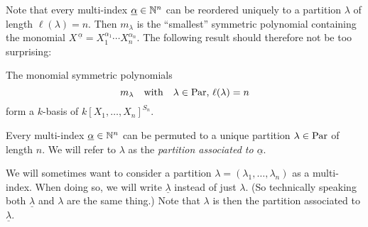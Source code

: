 \begin{fluff}
  Note that every multi-index $\underline{\alpha} \in \mathbb{N}^n$ can be reordered uniquely to a partition $\lambda$ of length $\ell(\lambda) = n$.
  Then $m_\lambda$ is the “smallest” symmetric polynomial containing the monomial $X^{\,\underline{\alpha}} = X_1^{\alpha_1} \dotsm X_n^{\alpha_n}$.
  The following result should therefore not be too surprising:
\end{fluff}


\begin{proposition}
  \label{proposition: m_lambda give a basis}
  The monomial symmetric polynomials
  \[
      m_\lambda
    \quad\text{with}\quad
      \lambda \in \operatorname{Par}, \,
      \ell(\lambda) = n
  \]
  form a $k$-basis of $k[X_1, \dotsc, X_n]^{S_n}$.
\end{proposition}


\begin{notation}
  Every multi-index $\underline{\alpha} \in \mathbb{N}^n$ can be permuted to a unique partition $\lambda \in \operatorname{Par}$ of length $n$.
  We will refer to $\lambda$ as the \emph{partition associated to $\underline{\alpha}$}.
  
  We will sometimes want to consider a partition $\lambda = (\lambda_1, \dotsc, \lambda_n)$ as a multi-index.
  When doing so, we will write $\underline{\lambda}$ instead of just $\lambda$.
  (So technically speaking both $\underline{\lambda}$ and $\lambda$ are the same thing.)
  Note that $\lambda$ is then the partition associated to $\underline{\lambda}$.
\end{notation}


